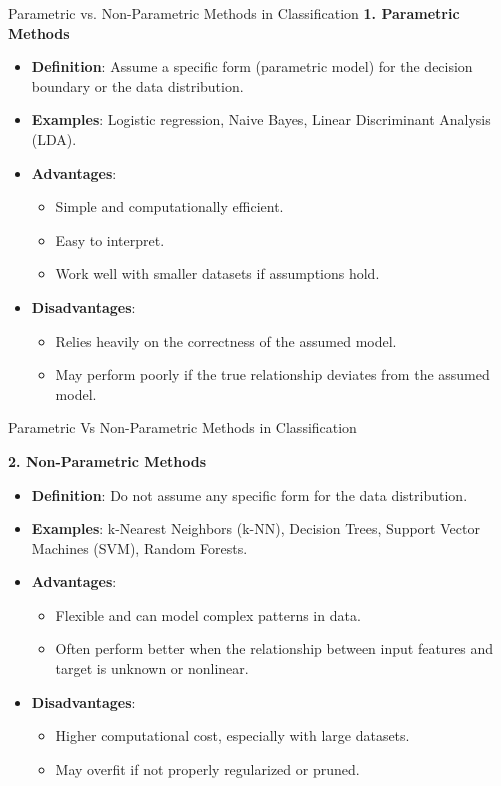 \documentclass[serif, aspectratio=169]{beamer}
\begin{document}
\begin{frame}{Parametric vs. Non-Parametric Methods in Classification}
    \textbf{1. Parametric Methods}
    \begin{itemize}
        \item \textbf{Definition}: Assume a specific form (parametric model) for the decision boundary or the data distribution.
        \item \textbf{Examples}: Logistic regression, Naive Bayes, Linear Discriminant Analysis (LDA).
        \item \textbf{Advantages}:
        \begin{itemize}
            \item Simple and computationally efficient.
            \item Easy to interpret.
            \item Work well with smaller datasets if assumptions hold.
        \end{itemize}
        \item \textbf{Disadvantages}:
        \begin{itemize}
            \item Relies heavily on the correctness of the assumed model.
            \item May perform poorly if the true relationship deviates from the assumed model.
        \end{itemize}
    \end{itemize}
\end{frame}
\begin{frame}{Parametric Vs Non-Parametric Methods in Classification}
    
    \textbf{2. Non-Parametric Methods}
    \begin{itemize}
        \item \textbf{Definition}: Do not assume any specific form for the data distribution. 
        \item \textbf{Examples}: k-Nearest Neighbors (k-NN), Decision Trees, Support Vector Machines (SVM), Random Forests.
        \item \textbf{Advantages}:
        \begin{itemize}
            \item Flexible and can model complex patterns in data.
            \item Often perform better when the relationship between input features and target is unknown or nonlinear.
        \end{itemize}
        \item \textbf{Disadvantages}:
        \begin{itemize}
            \item Higher computational cost, especially with large datasets.
            \item May overfit if not properly regularized or pruned.
        \end{itemize}
    \end{itemize}
\end{frame}
\end{document}
